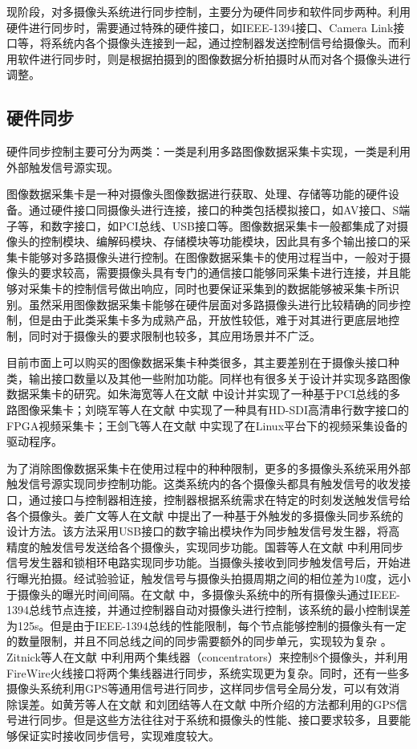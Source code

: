 现阶段，对多摄像头系统进行同步控制，主要分为硬件同步和软件同步两种。利用硬件进行同步时，需要通过特殊的硬件接口，如IEEE-1394接口、Camera Link接口等，将系统内各个摄像头连接到一起，通过控制器发送控制信号给摄像头。而利用软件进行同步时，则是根据拍摄到的图像数据分析拍摄时从而对各个摄像头进行调整。

\subsection{硬件同步}

硬件同步控制主要可分为两类：一类是利用多路图像数据采集卡实现，一类是利用外部触发信号源实现。

图像数据采集卡是一种对摄像头图像数据进行获取、处理、存储等功能的硬件设备。通过硬件接口同摄像头进行连接，接口的种类包括模拟接口，如AV接口、S端子等，和数字接口，如PCI总线、USB接口等。图像数据采集卡一般都集成了对摄像头的控制模块、编解码模块、存储模块等功能模块，因此具有多个输出接口的采集卡能够对多路摄像头进行控制。在图像数据采集卡的使用过程当中，一般对于摄像头的要求较高，需要摄像头具有专门的通信接口能够同采集卡进行连接，并且能够对采集卡的控制信号做出响应，同时也要保证采集到的数据能够被采集卡所识别。虽然采用图像数据采集卡能够在硬件层面对多路摄像头进行比较精确的同步控制，但是由于此类采集卡多为成熟产品，开放性较低，难于对其进行更底层地控制，同时对于摄像头的要求限制也较多，其应用场景并不广泛。

目前市面上可以购买的图像数据采集卡种类很多，其主要差别在于摄像头接口种类，输出接口数量以及其他一些附加功能。同样也有很多关于设计并实现多路图像数据采集卡的研究。如朱海宽等人在文献 \cite{17} 中设计并实现了一种基于PCI总线的多路图像采集卡；刘晓军等人在文献 \cite{刘晓军2009采用} 中实现了一种具有HD-SDI高清串行数字接口的FPGA视频采集卡；王剑飞等人在文献 \cite{王剑非2007基于} 中实现了在Linux平台下的视频采集设备的驱动程序。

为了消除图像数据采集卡在使用过程中的种种限制，更多的多摄像头系统采用外部触发信号源实现同步控制功能。这类系统内的各个摄像头都具有触发信号的收发接口，通过接口与控制器相连接，控制器根据系统需求在特定的时刻发送触发信号给各个摄像头。姜广文等人在文献 \cite{姜广文} 中提出了一种基于外触发的多摄像头同步系统的设计方法。该方法采用USB接口的数字输出模块作为同步触发信号发生器，将高精度的触发信号发送给各个摄像头，实现同步功能。国蓉等人在文献 \cite{国蓉2014具有} 中利用同步信号发生器和锁相环电路实现同步功能。当摄像头接收到同步触发信号后，开始进行曝光拍摄。经试验验证，触发信号与摄像头拍摄周期之间的相位差为10度，远小于摄像头的曝光时间间隔。在文献 \cite{Prochazka} 中，多摄像头系统中的所有摄像头通过IEEE-1394总线节点连接，并通过控制器自动对摄像头进行控制，该系统的最小控制误差为125\textmu s。但是由于IEEE-1394总线的性能限制，每个节点能够控制的摄像头有一定的数量限制，并且不同总线之间的同步需要额外的同步单元，实现较为复杂 \cite{Litos}。Zitnick等人在文献 \cite{Zitnick} 中利用两个集线器（concentrators）来控制8个摄像头，并利用FireWire火线接口将两个集线器进行同步，系统实现更为复杂。同时，还有一些多摄像头系统利用GPS等通用信号进行同步，这样同步信号全局分发，可以有效消除误差。如黄芳等人在文献 \cite{黄芳} 和刘团结等人在文献 \cite{刘团结} 中所介绍的方法都利用的GPS信号进行同步。但是这些方法往往对于系统和摄像头的性能、接口要求较多，且要能够保证实时接收同步信号，实现难度较大。

